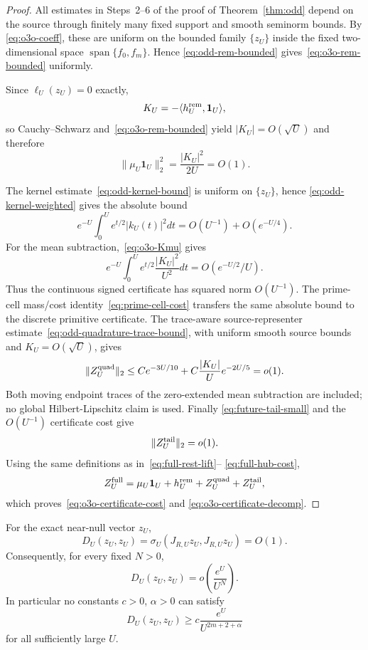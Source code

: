 \begin{proof}
All estimates in Steps~2--6 of the proof of Theorem~\ref{thm:odd} depend on the
source through finitely many fixed support and smooth seminorm bounds.  By
\eqref{eq:o3o-coeff}, these are uniform on the bounded family $\{z_U\}$ inside the
fixed two-dimensional space $\operatorname{span}\{f_0,f_m\}$.  Hence
\eqref{eq:odd-rem-bounded} gives~\eqref{eq:o3o-rem-bounded} uniformly.

Since $\ell_U(z_U)=0$ exactly,
\[
 K_U
 =-\langle h_U^{\rm rem},\mathbf1_U\rangle,
\]
so Cauchy--Schwarz and~\eqref{eq:o3o-rem-bounded} yield
$|K_U|=O(\sqrt U)$ and therefore
\[
 \|\mu_U\mathbf1_U\|_2^2
 =\frac{|K_U|^2}{2U}=O(1).
\]

The kernel estimate~\eqref{eq:odd-kernel-bound} is uniform on $\{z_U\}$, hence
\eqref{eq:odd-kernel-weighted} gives the absolute bound
\[
 e^{-U}\int_0^Ue^{t/2}|k_U(t)|^2dt
 =O(U^{-1})+O(e^{-U/4}).
\]
For the mean subtraction,~\eqref{eq:o3o-Kmu} gives
\[
 e^{-U}\int_0^Ue^{t/2}\frac{|K_U|^2}{U^2}dt
 =O(e^{-U/2}/U).
\]
Thus the continuous signed certificate has squared norm $O(U^{-1})$.
The prime-cell mass/cost identity~\eqref{eq:prime-cell-cost} transfers the same
absolute bound to the discrete primitive certificate.  The trace-aware
source-representer estimate~\eqref{eq:odd-quadrature-trace-bound}, with uniform
smooth source bounds and $K_U=O(\sqrt U)$, gives
\[
 \|Z_U^{\rm quad}\|_2
 \le C e^{-3U/10}+C\frac{|K_U|}{U}e^{-2U/5}=o(1).
\]
Both moving endpoint traces of the zero-extended mean subtraction are
included; no global Hilbert-Lipschitz claim is used.  Finally
\eqref{eq:future-tail-small} and the $O(U^{-1})$ certificate cost give
\[
 \|Z_U^{\rm tail}\|_2=o(1).
\]
Using the same definitions as in~\eqref{eq:full-rest-lift}--
\eqref{eq:full-hub-cost},
\[
 Z_U^{\rm full}
 =\mu_U\mathbf1_U+h_U^{\rm rem}+Z_U^{\rm quad}+Z_U^{\rm tail},
\]
which proves~\eqref{eq:o3o-certificate-cost} and
\eqref{eq:o3o-certificate-decomp}.
\end{proof}

\begin{theorem}\label{thm:o3o-nearnull-bounded}
For the exact near-null vector $z_U$,
\[
 \boxed{
 D_U(z_U,z_U)
 =\sigma_U(J_{R,U}z_U,J_{R,U}z_U)
 =O(1).
 }
\tag{O3O.6}\label{eq:o3o-D-bounded}
\]
Consequently, for every fixed $N>0$,
\[
 \boxed{
 D_U(z_U,z_U)
 =o\!\left(\frac{e^U}{U^N}\right).
 }
\tag{O3O.7}\label{eq:o3o-superpoly-relative}
\]
In particular no constants $c>0$, $\alpha>0$ can satisfy
\[
 D_U(z_U,z_U)
 \ge c\frac{e^U}{U^{2m+2+\alpha}}
\]
for all sufficiently large $U$.
\end{theorem}

